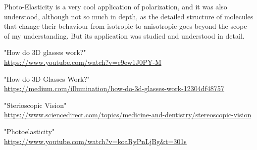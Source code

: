 \documentclass[11pt]{article}
\begin{document}
Photo-Elasticity is a very cool application of polarization, and it was also understood, although not so much in depth, as the detailed structure of molecules that change their behaviour from isotropic to anisotropic goes beyond the scope of my understanding. But its application was studied and understood in detail. 


\clearpage
\begin{thebibliography}{}
	
	"How do 3D glasses work?"\\
	\url{https://www.youtube.com/watch?v=c9ew1J0PY-M}

	"How do 3D Glasses Work?"\\
	\url{https://medium.com/illumination/how-do-3d-glasses-work-12304df48757}
		
	"Sterioscopic Vision"\\
	\url{https://www.sciencedirect.com/topics/medicine-and-dentistry/stereoscopic-vision}
	
	"Photoelasticity"\\
	\url{https://www.youtube.com/watch?v=koaRyPnLjBg&t=301s}
	
	
\end{thebibliography}
	
\end{document}
